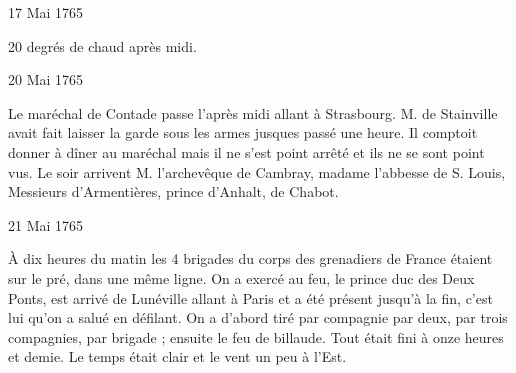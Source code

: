                      \begin{diary}{17 Mai 1765}{}


                           20 degrés de chaud
                           après midi.
                        \bigskip


                     \end{diary}
                     \begin{diary}{20 Mai 1765}{}


                           Le maréchal de Contade passe l'après midi allant
                           à Strasbourg. M. de Stainville avait fait laisser
                           la garde sous les armes jusques passé une heure.
                           Il comptoit donner à dîner au maréchal mais
                           il ne s'est point arrêté et ils ne se sont point vus.
                           Le soir arrivent M. l'archevêque de
                              Cambray,
                           madame l'abbesse de S. Louis, Messieurs
                           d'Armentières, prince
                              d'Anhalt, de
                           Chabot. \bigskip


                     \end{diary}
                     \begin{diary}{21 Mai 1765}{}

                         À dix heures du matin les 4
                           brigades du
                           corps des grenadiers de
                              France étaient sur le
                           pré, dans une même ligne. On a exercé
                           au feu, le prince duc des Deux Ponts, est arrivé
                           de Lunéville allant à
                              Paris et a été présent
                           jusqu'à la fin, c'est lui qu'on a salué en
                           défilant. On a d'abord tiré par compagnie
                           par deux, par trois compagnies, par
                           brigade ; ensuite le feu de billaude. Tout
                           était fini à onze heures et demie. Le temps
                           était clair et le vent un peu à l'Est. \bigskip


                     \end{diary}
